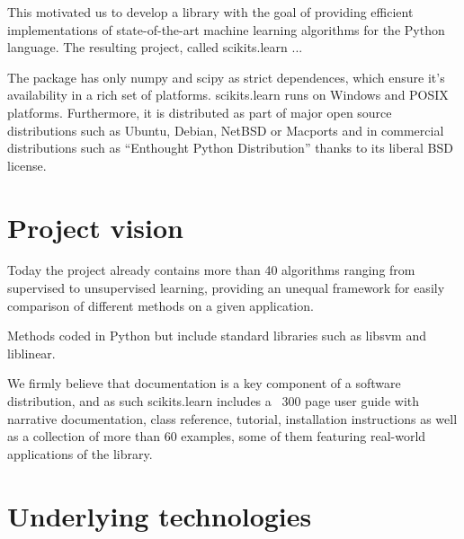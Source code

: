 \documentclass[twoside,11pt]{article}
\begin{document}


This motivated us to develop a library with the goal of providing
efficient implementations of state-of-the-art machine learning
algorithms for the Python language. The resulting project, called
scikits.learn ...



The package has only numpy and scipy as strict dependences, which
ensure it's availability in a rich set of platforms. scikits.learn
runs on Windows and POSIX platforms. Furthermore, it is distributed as
part of major open source distributions such as Ubuntu, Debian, NetBSD
or Macports and in commercial distributions such as ``Enthought Python
Distribution'' thanks to its liberal BSD license.


\section {Project vision}


Today the project already contains more than 40 algorithms ranging
from supervised to unsupervised learning, providing an unequal
framework for easily comparison of different methods on a given
application.

Methods coded in Python but include standard libraries such as libsvm
and liblinear.

We firmly believe that documentation is a key component of a software
distribution, and as such scikits.learn includes a ~300 page user
guide with narrative documentation, class reference, tutorial,
installation instructions as well as a collection of more than 60
examples, some of them featuring real-world applications of the
library.


\section{Underlying technologies}


\end{document}
